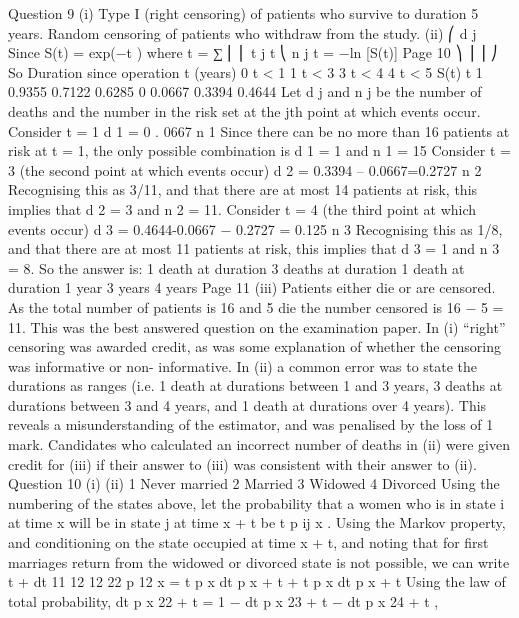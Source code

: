 \documentclass[a4paper,12pt]{article}
\begin{document}
\begin{enumerate}
Question 9
(i)
Type I (right censoring) of patients who survive to duration 5 years.
Random censoring of patients who withdraw from the study.
(ii)
⎛ d j
Since S(t) = exp(−\lambda t ) where \lambda t = ∑ ⎜
⎜
t j \leq t ⎝ n j
\lambda t = −ln [S(t)]
Page 10
⎞
⎟
⎟
⎠ %
So
Duration since operation t (years)
0 \leq t < 1
1 \leq t < 3
3 \leq t < 4
4 \leq t < 5
S(t) \lambda t
1
0.9355
0.7122
0.6285 0
0.0667
0.3394
0.4644
Let d j and n j be the number of deaths and the number in the risk set at the jth point at
which events occur.
Consider t = 1
d 1
= 0 . 0667
n 1
Since there can be no more than 16 patients at risk at t = 1, the only possible
combination is d 1 = 1 and n 1 = 15
Consider t = 3 (the second point at which events occur)
d 2
= 0.3394 – 0.0667=0.2727
n 2
Recognising this as 3/11, and that there are at most 14 patients at risk, this implies that
d 2 = 3 and n 2 = 11.
Consider t = 4 (the third point at which events occur)
d 3
= 0.4644-0.0667 − 0.2727 = 0.125
n 3
Recognising this as 1/8, and that there are at most 11 patients at risk, this implies that
d 3 = 1 and n 3 = 8.
So the answer is:
1 death at duration
3 deaths at duration
1 death at duration
1 year
3 years
4 years
Page 11 %
(iii)
Patients either die or are censored. As the total number of patients is 16 and 5 die the
number censored is 16 − 5 = 11.
This was the best answered question on the examination paper. In (i) “right” censoring was
awarded credit, as was some explanation of whether the censoring was informative or non-
informative. In (ii) a common error was to state the durations as ranges (i.e. 1 death at
durations between 1 and 3 years, 3 deaths at durations between 3 and 4 years, and 1 death at
durations over 4 years). This reveals a misunderstanding of the estimator, and was penalised
by the loss of 1 mark. Candidates who calculated an incorrect number of deaths in (ii) were
given credit for (iii) if their answer to (iii) was consistent with their answer to (ii).
Question 10
(i)
(ii)
1 Never married 2 Married
3 Widowed 4 Divorced
Using the numbering of the states above, let the probability that a women who is in
state i at time x will be in state j at time x + t be t p ij x .
Using the Markov property, and conditioning on the state occupied
at time x + t,
and noting that for first marriages return from the widowed or
divorced state is not possible, we can write
t + dt
11
12
12
22
p 12
x = t p x dt p x + t + t p x dt p x + t
Using the law of total probability,
dt
p x 22 + t = 1 − dt p x 23 + t − dt p x 24 + t ,

\end{enumerate}
\end{document}
